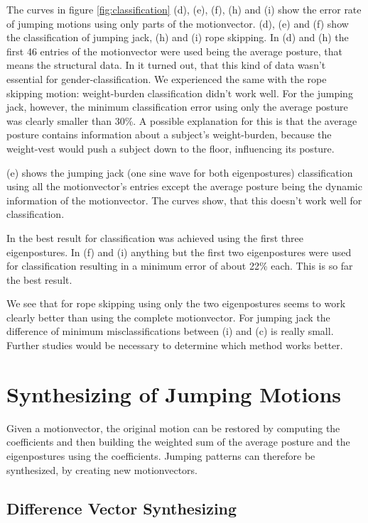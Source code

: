 \documentclass[a4paper]{article}
\begin{document}
The curves in figure \ref{fig:classification} (d), (e), (f), (h) and (i) show the error rate of jumping motions using only parts of the motionvector. (d), (e) and (f) show the classification of jumping jack, (h) and (i) rope skipping. In (d) and (h) the first 46 entries of the motionvector were used being the average posture, that means the structural data. In \cite{origin} it turned out, that this kind of data wasn't essential for gender-classification. We experienced the same with the rope skipping motion: weight-burden classification didn't work well. For the jumping jack, however, the minimum classification error using only the average posture was clearly smaller than 30\%. A possible explanation for this is that the average posture contains information about a subject's weight-burden, because the weight-vest would push a subject down to the floor, influencing its posture.

(e) shows the jumping jack (one sine wave for both eigenpostures) classification using all the motionvector's entries except the average posture being the dynamic information of the motionvector. The curves show, that this doesn't work well for classification.

In \cite{origin} the best result for classification was achieved using the first three eigenpostures. In (f) and (i) anything but the first two eigenpostures were used for classification resulting in a minimum error of about 22\% each. This is so far the best result.

We see that for rope skipping using only the two eigenpostures seems to work clearly better than using the complete motionvector. For jumping jack the difference of minimum misclassifications between (i) and (c) is really small. Further studies would be necessary to determine which method works better.


\section{Synthesizing of Jumping Motions}

Given a motionvector, the original motion can be restored by computing the coefficients and then building the weighted sum of the average posture and the eigenpostures using the coefficients.
Jumping patterns can therefore be synthesized, by creating new motionvectors.

\subsection{Difference Vector Synthesizing}
\end{document}
